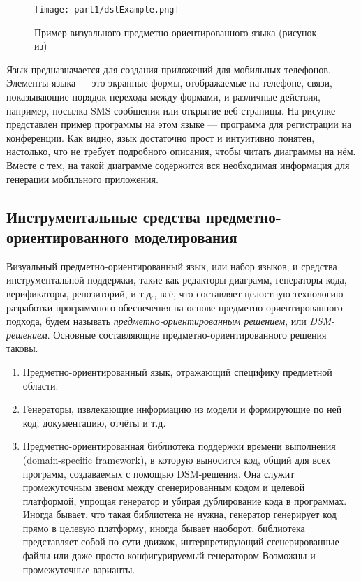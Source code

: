 \begin{figure} [ht]
	\begin{center}
		\texttt{[image: part1/dslExample.png]}
		\caption{Пример визуального предметно-ориентированного языка (рисунок из\cite{kelly2008domain})}
		\label{dslExample}
	\end{center}
\end{figure}

Язык предназначается для создания приложений для мобильных телефонов. 
Элементы языка --- это экранные формы, отображаемые на телефоне, связи, 
показывающие порядок перехода между формами, и различные действия, например, 
посылка SMS-сообщения или открытие веб-страницы. На рисунке представлен пример 
программы на этом языке --- программа для регистрации на конференции. 
Как видно, язык достаточно прост и интуитивно понятен, настолько, что не требует 
подробного описания, чтобы читать диаграммы на нём. Вместе с тем, на такой 
диаграмме содержится вся необходимая информация для генерации мобильного 
приложения.

\subsection{Инструментальные средства предметно-ориентированного моделирования}
Визуальный предметно-ориентированный язык, или набор языков, и средства 
инструментальной поддержки, такие как редакторы диаграмм, генераторы кода, 
верификаторы, репозиторий, и т.д., всё, что составляет целостную технологию 
разработки программного обеспечения на основе предметно-ориентированного 
подхода, будем называть \textit{предметно-ориентированным решением}, или \textit{DSM-решением}. 
Основные составляющие предметно-ориентированного решения таковы.

\begin{enumerate}
	\item Предметно-ориентированный язык, отражающий специфику предметной области.
	\item Генераторы, извлекающие информацию из модели и формирующие по ней код, 
		документацию, отчёты и т.д.
	\item Предметно-ориентированная библиотека поддержки времени выполнения 
		(domain-specific framework), в которую выносится код, общий для всех 
		программ, создаваемых с помощью DSM-решения. Она служит промежуточным звеном 
		между сгенерированным кодом и целевой платформой, упрощая генератор и убирая 
		дублирование кода в программах. Иногда бывает, что такая библиотека не 
		нужна, генератор генерирует код прямо в целевую платформу, иногда бывает 
		наоборот, библиотека представляет собой по сути движок, интерпретирующий 
		сгенерированные файлы или даже просто конфигурируемый генератором 
		Возможны и промежуточные варианты.
\end{enumerate}

